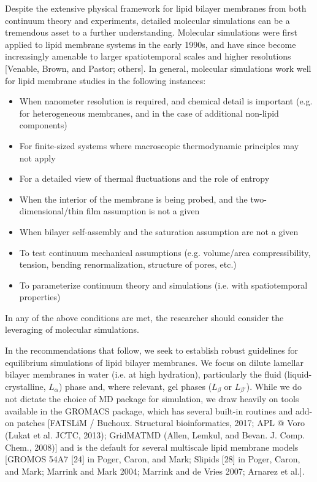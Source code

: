 \documentclass[9pt,bestpractices]{livecoms}
\begin{document}
Despite the extensive physical framework for lipid bilayer membranes from both continuum theory and experiments, detailed molecular simulations can be a tremendous asset to a further understanding.
Molecular simulations were first applied to lipid membrane systems in the early 1990s, and have since become increasingly amenable to larger spatiotemporal scales and higher resolutions [Venable, Brown, and Pastor; others].
In general, molecular simulations work well for lipid membrane studies in the following instances:
\begin{itemize}
	\item When nanometer resolution is required, and chemical detail is important (e.g. for heterogeneous membranes, and in the case of additional non-lipid components)
	\item For finite-sized systems where macroscopic thermodynamic principles may not apply
	\item For a detailed view of thermal fluctuations and the role of entropy
	\item When the interior of the membrane is being probed, and the two-dimensional/thin film assumption is not a given
	\item When bilayer self-assembly and the saturation assumption are not a given
	\item To test continuum mechanical assumptions (e.g. volume/area compressibility, tension, bending renormalization, structure of pores, etc.)
	\item To parameterize continuum theory and simulations (i.e. with spatiotemporal properties)
\end{itemize}

In any of the above conditions are met, the researcher should consider the leveraging of molecular simulations.

In the recommendations that follow, we seek to establish robust guidelines for equilibrium simulations of lipid bilayer membranes.
We focus on dilute lamellar bilayer membranes in water (i.e. at high hydration), particularly the fluid (liquid-crystalline, $L_\alpha$) phase and, where relevant, gel phases ($L_\beta$ or $L_{\beta '}$).
While we do not dictate the choice of MD package for simulation, we draw heavily on tools available in the GROMACS package, which has several built-in routines and add-on patches [FATSLiM / Buchoux. Structural bioinformatics, 2017; APL @ Voro (Lukat et al. JCTC, 2013); GridMATMD (Allen, Lemkul, and Bevan. J. Comp. Chem., 2008)] and is the default for several multiscale lipid membrane models [GROMOS 54A7 [24] in Poger, Caron, and Mark; Slipids [28] in Poger, Caron, and Mark; Marrink and Mark 2004; Marrink and de Vries 2007; Arnarez et al.].
\end{document}
